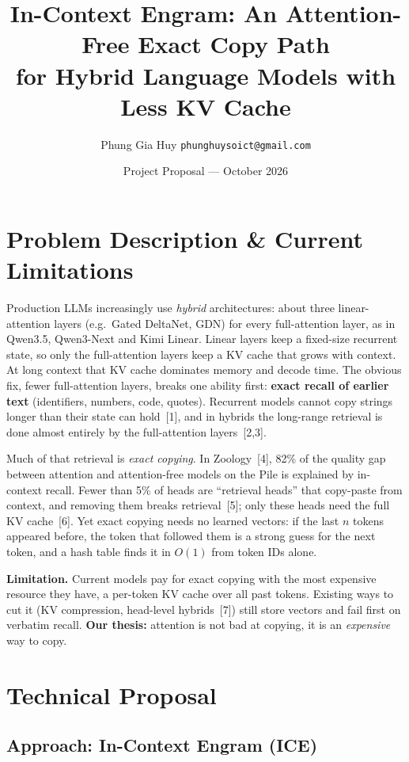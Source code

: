 \documentclass[10pt]{article}
\title{\vspace{-2.2em}\textbf{In-Context Engram: An Attention-Free Exact Copy Path\\for Hybrid Language Models with Less KV Cache}}
\author{Phung Gia Huy \quad \texttt{phunghuysoict@gmail.com}}
\date{Project Proposal --- October 2026}
\begin{document}
\maketitle
\vspace{-2.5em}

\section{Problem Description \& Current Limitations}

Production LLMs increasingly use \emph{hybrid} architectures: about three linear-attention layers (e.g.\ Gated DeltaNet, GDN) for every full-attention layer, as in Qwen3.5, Qwen3-Next and Kimi Linear. Linear layers keep a fixed-size recurrent state, so only the full-attention layers keep a KV cache that grows with context. At long context that KV cache dominates memory and decode time. The obvious fix, fewer full-attention layers, breaks one ability first: \textbf{exact recall of earlier text} (identifiers, numbers, code, quotes). Recurrent models cannot copy strings longer than their state can hold~[1], and in hybrids the long-range retrieval is done almost entirely by the full-attention layers~[2,3].

Much of that retrieval is \emph{exact copying}. In Zoology~[4], 82\% of the quality gap between attention and attention-free models on the Pile is explained by in-context recall. Fewer than 5\% of heads are ``retrieval heads'' that copy-paste from context, and removing them breaks retrieval~[5]; only these heads need the full KV cache~[6]. Yet exact copying needs no learned vectors: if the last $n$ tokens appeared before, the token that followed them is a strong guess for the next token, and a hash table finds it in $O(1)$ from token IDs alone.

\textbf{Limitation.} Current models pay for exact copying with the most expensive resource they have, a per-token KV cache over all past tokens. Existing ways to cut it (KV compression, head-level hybrids~[7]) still store vectors and fail first on verbatim recall. \textbf{Our thesis:} attention is not bad at copying, it is an \emph{expensive} way to copy.

\section{Technical Proposal}

\subsection{Approach: In-Context Engram (ICE)}
\end{document}
